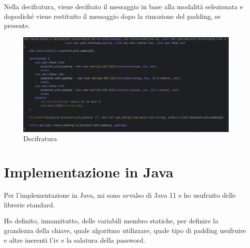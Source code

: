  

\textsf{\small Nella decifratura, viene decifrato il messaggio in base alla modalità selezionata e dopodiché viene restituito il messaggio dopo la rimozione del padding, se presente.}

\begin{figure}[H]
	\centering
	\includegraphics[width=1\textwidth, height=1\textheight, keepaspectratio]{./images/code/cpp/api/decrypt.PNG}
	\caption{Decifratura}
	\label{fig:decrypt}
\end{figure}




\section{Implementazione in Java}


\textsf{\small Per l'implementazione in Java, mi sono avvalso di Java 11 e ho usufruito delle librerie standard.}

   

\textsf{\small Ho definito, innanzitutto, delle variabili membro statiche, per definire la grandezza della chiave, quale algoritmo utilizzare, quale tipo di padding usufruire e altre inerenti l'iv e la salatura della password.}


